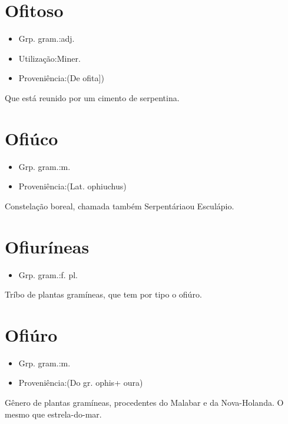 \section{Ofitoso}
\begin{itemize}
\item {Grp. gram.:adj.}
\end{itemize}
\begin{itemize}
\item {Utilização:Miner.}
\end{itemize}
\begin{itemize}
\item {Proveniência:(De \textunderscore ofita\textunderscore ])}
\end{itemize}
Que está reunido por um cimento de serpentina.
\section{Ofiúco}
\begin{itemize}
\item {Grp. gram.:m.}
\end{itemize}
\begin{itemize}
\item {Proveniência:(Lat. \textunderscore ophiuchus\textunderscore )}
\end{itemize}
Constelação boreal, chamada também \textunderscore Serpentária\textunderscore  ou \textunderscore Esculápio\textunderscore .
\section{Ofiuríneas}
\begin{itemize}
\item {Grp. gram.:f. pl.}
\end{itemize}
Tríbo de plantas gramíneas, que tem por tipo o ofiúro.
\section{Ofiúro}
\begin{itemize}
\item {Grp. gram.:m.}
\end{itemize}
\begin{itemize}
\item {Proveniência:(Do gr. \textunderscore ophis\textunderscore  + \textunderscore oura\textunderscore )}
\end{itemize}
Gênero de plantas gramíneas, procedentes do Malabar e da Nova-Holanda.
O mesmo que \textunderscore estrela-do-mar\textunderscore .
